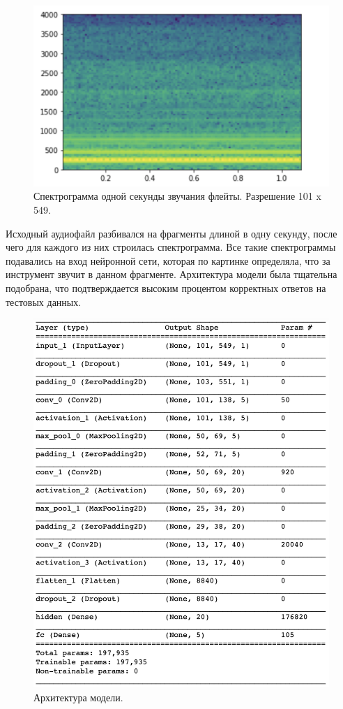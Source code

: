 \documentclass[14pt,a4paper]{article}
\begin{document}
\begin{figure}[H]
\centering
\includegraphics[scale=0.3]{img/spectrogram.png}
\caption{Спектрограмма одной секунды звучания флейты. Разрешение 101 x 549.}
\label{fig:diagram}
\end{figure}

Исходный аудиофайл разбивался на фрагменты длиной в одну секунду, после чего для каждого из них строилась спектрограмма. Все такие спектрограммы подавались на вход нейронной сети, которая по картинке определяла, что за инструмент звучит в данном фрагменте. Архитектура модели была тщательна подобрана, что подтверждается высоким процентом корректных ответов на тестовых данных.

\begin{figure}[H]
\centering
\includegraphics[scale=0.5]{img/model.png}
\caption{Архитектура модели.}
\label{fig:diagram}
\end{figure}
\end{document}
